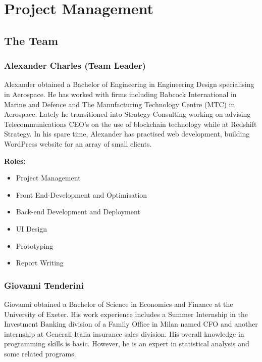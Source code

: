 \documentclass[fontsize=10pt]{extarticle}
\numberwithin{figure}{section} %
\providecommand{\tightlist}{%
  \setlength{\itemsep}{0pt}\setlength{\parskip}{0pt}}
\begin{document}
\hypertarget{project-management}{%
\section{Project Management}\label{project-management}}

\hypertarget{the-team}{%
\subsection{The Team}\label{the-team}}

\hypertarget{alexander-charles-team-leader}{%
\subsubsection{Alexander Charles (Team
Leader)}\label{alexander-charles-team-leader}}

Alexander obtained a Bachelor of Engineering in Engineering Design
specialising in Aerospace. He has worked with firms including Babcock
International in Marine and Defence and The Manufacturing Technology
Centre (MTC) in Aerospace. Lately he transitioned into Strategy
Consulting working on advising Telecommunications CEO's on the use of
blockchain technology while at Redshift Strategy. In his spare time,
Alexander has practised web development, building WordPress website for
an array of small clients.

\textbf{Roles:}

\begin{itemize}
\tightlist
\item
  Project Management
\item
  Front End-Development and Optimisation
\item
  Back-end Development and Deployment
\item
  UI Design
\item
  Prototyping
\item
  Report Writing
\end{itemize}

\hypertarget{giovanni-tenderini}{%
\subsubsection{Giovanni Tenderini}\label{giovanni-tenderini}}

Giovanni obtained a Bachelor of Science in Economics and Finance at the
University of Exeter. His work experience includes a Summer Internship
in the Investment Banking division of a Family Office in Milan named CFO
and another internship at Generali Italia insurance sales division. His
overall knowledge in programming skills is basic. However, he is an
expert in statistical analysis and some related programs.
\end{document}
